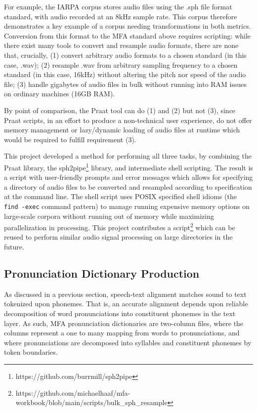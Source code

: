 \documentclass[11pt]{article}
\begin{document}
For example, the IARPA corpus stores audio files using the .sph file format standard, with audio recorded at an 8kHz sample rate. This corpus therefore demonstrates a key example of a corpus needing transformations in both metrics. Conversion from this format to the MFA standard above requires scripting: while there exist many tools to convert and resample audio formats, there are none that, crucially, (1) convert arbitrary audio formats to a chosen standard (in this case, .wav); (2) resample .wav from arbitrary sampling frequency to a chosen standard (in this case, 16kHz) without altering the pitch nor speed of the audio file; (3) handle gigabytes of audio files in bulk without running into RAM issues on ordinary machines (16GB RAM).

By point of comparison, the Praat tool can do (1) and (2) but not (3), since Praat scripts, in an effort to produce a non-technical user experience, do not offer memory management or lazy/dynamic loading of audio files at runtime which would be required to fulfill requirement (3).

This project developed a method for performing all three tasks, by combining the Praat library, the sph2pipe\footnote{https://github.com/burrmill/sph2pipe} library, and intermediate shell scripting. The result is a script with user-friendly prompts and error messages which allows for specifying a directory of audio files to be converted and resampled according to specification at the command line. The shell script uses POSIX specified shell idioms (the \verb|find -exec| command pattern) to manage running expensive memory options on large-scale corpora without running out of memory while maximizing parallelization in processing. This project contributes a script\footnote{https://github.com/michaelhaaf/mfa-workbook/blob/main/scripts/bulk\_sph\_resample} which can be reused to perform similar audio signal processing on large directories in the future.

\subsection{Pronunciation Dictionary Production}

As discussed in a previous section, speech-text alignment matches sound to text tokenized upon phonemes. That is, an accurate alignment depends upon reliable decomposition of word pronunciations into constituent phonemes in the text layer. As such, MFA pronunciation dictionaries are two-column files, where the columns represent a one to many mapping from words to pronunciations, and where pronunciations are decomposed into syllables and constituent phonemes by token boundaries.
\end{document}
